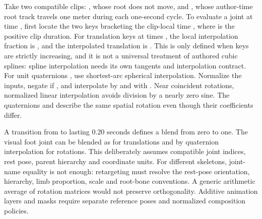 Take two compatible clips: , whose root does not move, and , whose author-time root track travels one meter during each one-second cycle. To evaluate a joint at time , first locate the two keys bracketing the clip-local time , where  is the positive clip duration. For translation keys  at times , the local interpolation fraction is , and the interpolated translation is . This is only defined when keys are strictly increasing, and it is not a universal treatment of authored cubic splines: spline interpolation needs its own tangents and interpolation contract. For unit quaternions , use shortest-arc spherical interpolation. Normalize the inputs, negate  if , and interpolate by  and  with . Near coincident rotations, normalized linear interpolation avoids division by a nearly zero sine. The quaternions  and  describe the same spatial rotation even though their coefficients differ.

A transition from  to  lasting 0.20 seconds defines a blend  from zero to one. The visual foot joint can be blended as  for translations and by quaternion interpolation for rotations. This deliberately assumes compatible joint indices, rest pose, parent hierarchy and coordinate units. For different skeletons, joint-name equality is not enough: retargeting must resolve the rest-pose orientation, hierarchy, limb proportion, scale and root-bone conventions. A generic arithmetic average of rotation matrices would not preserve orthogonality. Additive animation layers and masks require separate reference poses and normalized composition policies.


